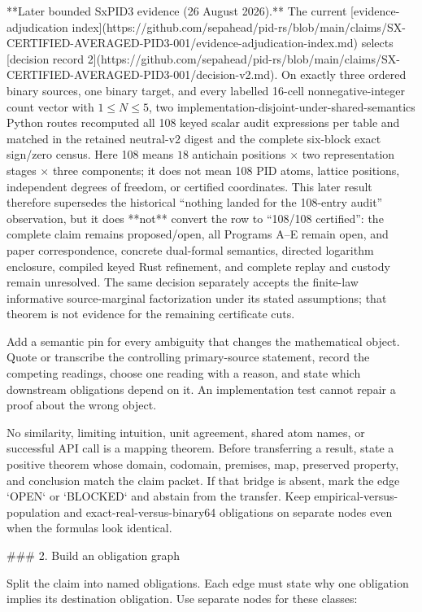 \documentclass[11pt]{article}
\begin{document}
\begin{markdown}
**Later bounded SxPID3 evidence (26 August 2026).** The current
[evidence-adjudication index](https://github.com/sepahead/pid-rs/blob/main/claims/SX-CERTIFIED-AVERAGED-PID3-001/evidence-adjudication-index.md)
selects
[decision record 2](https://github.com/sepahead/pid-rs/blob/main/claims/SX-CERTIFIED-AVERAGED-PID3-001/decision-v2.md). On exactly three ordered
binary sources, one binary target, and every labelled 16-cell nonnegative-integer count vector
with $1\le N\le5$, two implementation-disjoint-under-shared-semantics Python routes recomputed all
108 keyed scalar audit expressions per table and matched in the retained neutral-v2 digest and the
complete six-block exact sign/zero census. Here 108 means
$18$ antichain positions $\times$ two representation stages $\times$ three components; it does not
mean 108 PID atoms, lattice positions, independent degrees of freedom, or certified coordinates.
This later result therefore supersedes the historical “nothing landed for the 108-entry audit”
observation, but it does **not** convert the row to “108/108 certified”: the complete claim remains
proposed/open, all Programs A--E remain open, and paper correspondence, concrete dual-formal
semantics, directed logarithm enclosure, compiled keyed Rust refinement, and complete replay and
custody remain unresolved. The same decision separately accepts the finite-law informative
source-marginal factorization under its stated assumptions; that theorem is not evidence for the
remaining certificate cuts.

Add a semantic pin for every ambiguity that changes the mathematical object. Quote or transcribe
the controlling primary-source statement, record the competing readings, choose one reading with
a reason, and state which downstream obligations depend on it. An implementation test cannot
repair a proof about the wrong object.

No similarity, limiting intuition, unit agreement, shared atom names, or successful API call is a
mapping theorem. Before transferring a result, state a positive theorem whose domain, codomain,
premises, map, preserved property, and conclusion match the claim packet. If that bridge is absent,
mark the edge `OPEN` or `BLOCKED` and abstain from the transfer. Keep empirical-versus-population
and exact-real-versus-binary64 obligations on separate nodes even when the formulas look identical.

### 2. Build an obligation graph

Split the claim into named obligations. Each edge must state why one obligation implies its
destination obligation. Use separate nodes for these classes:


\end{markdown}
\end{document}
